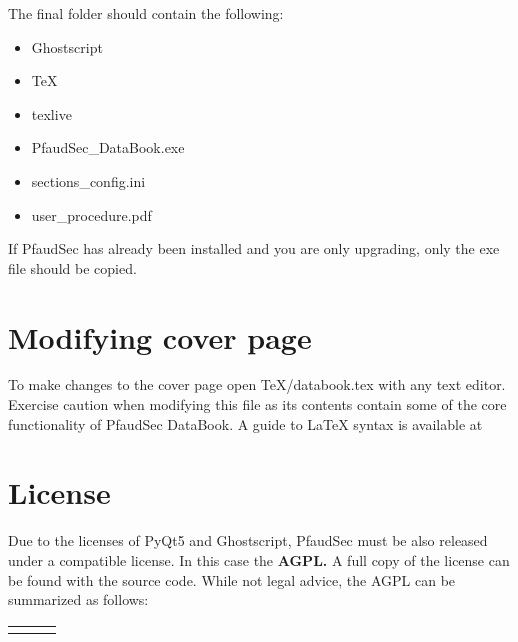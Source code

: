 \documentclass[14pt]{article}
\newcommand{\chref}[3][black]{\href{#2}{\color{#1}{#3}}}%
\newcommand{\ifolder}{\item[\faFolderOpen]}
\newcommand{\ifile}{\item[\faFileText]}
\begin{document}
\begin{flushleft}
\begin{enumerate}
The final folder should contain the following:
\begin{tcolorbox}[
boxrule=0.5pt,
colback=backgrey,
colframe=bordergrey,
sharpish corners] 
\begin{itemize}[labelsep = 1.5em, align=center]

\ifolder Ghostscript
\ifolder TeX
\ifolder texlive
\ifile PfaudSec\_DataBook.exe
\ifile sections\_config.ini
\ifile user\_procedure.pdf

\end{itemize}
\end{tcolorbox}

If PfaudSec has already been installed and you are only upgrading, only the exe file should be copied.

\end{enumerate}

\section{Modifying cover page}

To make changes to the cover page open TeX/databook.tex with any text editor.
Exercise caution when modifying this file as its contents contain some of the core functionality of PfaudSec DataBook.
A guide to \LaTeX\xspace syntax is available at 
\chref[pfblue]{https://en.wikibooks.org/wiki/LaTeX/Basics}{https://en.wikibooks.org/wiki/LaTeX/Basics}

%

\section{License}
Due to the licenses of PyQt5 and Ghostscript, PfaudSec must be also released under a compatible license.
In this case the \textbf{AGPL.}
A full copy of the license can be found with the source code.
While not legal advice, the AGPL can be summarized as follows:\\[\normalbaselineskip]

\def\tabularxcolumn#1{m{#1}}
\begin{tabularx}{\textwidth}{YYY}

\begin{tcolorbox}[
	equal height group=license,
	coltitle=black,
	title=\centering Must,
	boxrule=0.5pt,
	colback=backgrey,
	colframe=bordergrey,
	sharpish corners] 
\begin{itemize}[leftmargin=*]


\end{itemize}
\end{tcolorbox}
\end{tabularx}
\end{flushleft}
\end{document}

